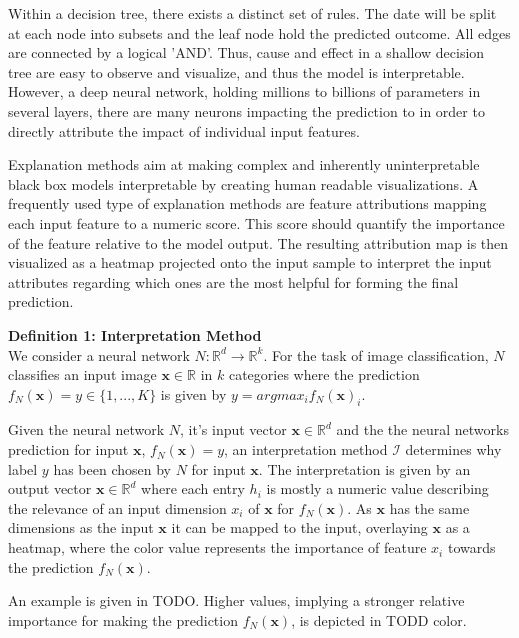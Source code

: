 Within a decision tree, there exists a distinct set of rules. The date will be split at each node into subsets and the leaf node hold the predicted outcome. All edges are connected by a logical 'AND'. Thus, cause and effect in a shallow decision tree are easy to observe and visualize, and thus the model is interpretable. 
However, a deep neural network, holding millions to billions of parameters in several layers, there are many neurons impacting the prediction to in order to directly attribute the impact of individual input features.  

Explanation methods aim at making complex and inherently uninterpretable black box models interpretable by creating human readable visualizations. 
A frequently used type of explanation methods are feature attributions mapping each input feature to a numeric score. This score should quantify the importance of the feature relative to the model output. The resulting attribution map is then visualized as a heatmap projected onto the input sample to interpret the input attributes regarding which ones are the most helpful for forming the final prediction. 

\textbf{Definition 1: Interpretation Method}\\
We consider a neural network $N: \mathbb{R}^d \to \mathbb{R}^k$. For the task of image classification, $N$ classifies an input image $\mathbf{x}\in \mathbb{R}$ in $k$ categories where the prediction $f_N(\mathbf{x})=y \in \{1, ..., K\}$ is given by $y = arg max_i f_N(\mathbf{x})_i$.

Given the neural network $N$, it's input vector $\mathbf{x} \in \mathbb{R}^d$ and the the neural networks prediction for input $\mathbf{x}$, $f_N(\mathbf{x})=y$, an interpretation method $\mathcal{I}$ determines why label $y$ has been chosen by $N$ for input $\mathbf{x}$. 
The interpretation is given by an output vector $\mathbf{x} \in \mathbb{R}^d$ where each entry $h_i$ is mostly a numeric value describing the relevance of an input dimension $x_i$ of $\mathbf{x}$ for $f_N(\mathbf{x})$. 
As $\mathbf{x}$ has the same dimensions as the input $\mathbf{x}$ it can be mapped to the input, overlaying $\mathbf{x}$ as a heatmap, where the color value represents the importance of feature $x_i$ towards the prediction $f_N(\mathbf{x})$.

An example is given in TODO. Higher values, implying a stronger relative importance for making the prediction $f_N(\mathbf{x})$, is depicted in TODD color. 



